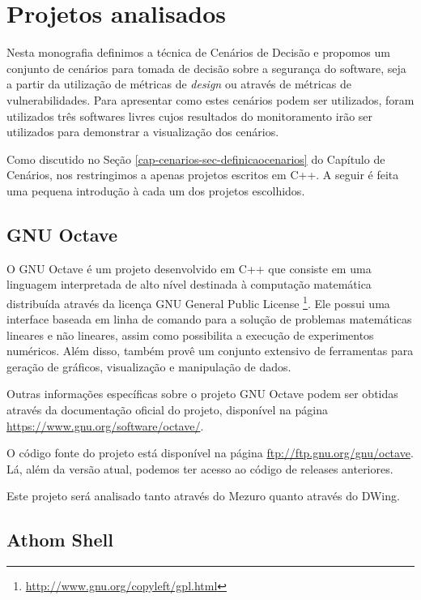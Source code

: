 \section{Projetos analisados}
\label{cap-projects}

Nesta monografia definimos a técnica de Cenários de Decisão e propomos um conjunto de cenários para tomada de decisão sobre a segurança do software, seja a partir da utilização de métricas de \emph{design} ou através de métricas de vulnerabilidades. Para apresentar como estes cenários podem ser utilizados, foram utilizados três softwares livres cujos resultados do monitoramento irão ser utilizados para demonstrar a visualização dos cenários.

Como discutido no Seção \ref{cap-cenarios-sec-definicaocenarios} do Capítulo de Cenários, nos restringimos a apenas projetos escritos em C++. A seguir é feita uma pequena introdução à cada um dos projetos escolhidos.

\subsection{GNU Octave}
\label{section-octave}

O GNU Octave é um projeto desenvolvido em C++ que consiste em uma linguagem interpretada de alto nível destinada à computação matemática distribuída através da licença GNU General Public License \footnote{\url{http://www.gnu.org/copyleft/gpl.html}}. Ele possui uma interface baseada em linha de comando para a solução de problemas matemáticas lineares e não lineares, assim como possibilita a execução de experimentos numéricos. Além disso, também provê um conjunto extensivo de ferramentas para geração de gráficos, visualização e manipulação de dados.

Outras informações específicas sobre o projeto GNU Octave podem ser obtidas através da documentação oficial do projeto, disponível na página \url{https://www.gnu.org/software/octave/}.

O código fonte do projeto está disponível na página \url{ftp://ftp.gnu.org/gnu/octave}. Lá, além da versão atual, podemos ter acesso ao código de releases anteriores.

Este projeto será analisado tanto através do Mezuro quanto através do DWing.


\subsection{Athom Shell}
\label{section-athom}

